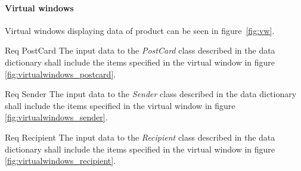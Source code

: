 \documentclass[10pt,a4paper]{article}
\begin{document}
\paragraph{Virtual windows}
Virtual windows displaying data of product can be seen in figure~\ref{fig:vw}.

\begin {description}
	\item [Req \thesubsubsection {.\thedata} PostCard] The input data to the \textit{PostCard} class described in the data dictionary shall include the items specified in the virtual window in figure \ref{fig:virtualwindows_postcard}.

	\item [Req \thesubsubsection {.\thedata} Sender] The input data to the \textit{Sender} class described in the data dictionary shall include the items specified in the virtual window in figure \ref{fig:virtualwindows_sender}.

	\item [Req \thesubsubsection {.\thedata} Recipient] The input data to the \textit{Recipient} class described in the data dictionary shall include the items specified in the virtual window in figure \ref{fig:virtualwindows_recipient}.

\end{description}
\hfill
\end{document}
